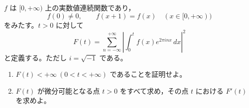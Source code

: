 \newcommand{\C}{\mathbb{C}}
\newcommand{\R}{\mathbb{R}}
\newcommand{\Z}{\mathbb{Z}}
\newcommand{\Tr}{\operatorname{Tr}}
\newcommand{\Impart}{\operatorname{Im}}
\newcommand{\AF}{\operatorname{AF}}
\newcommand{\AX}{\operatorname{AX}}
\newcommand{\GL}{\operatorname{GL}}


\(f\) は \([0,+\infty)\) 上の実数値連続関数であり，
\[
  f(0)\ne0,\qquad f(x+1)=f(x)\quad (x\in[0,+\infty))
\]
をみたす。\(t>0\) に対して
\[
  F(t)=\sum_{n=-\infty}^{+\infty}
  \left|\int_0^t f(x)e^{2\pi i n x}\,dx\right|^2
\]
と定義する。ただし \(i=\sqrt{-1}\) である。

\begin{enumerate}
  \item \(F(t)<+\infty\ (0<t<+\infty)\) であることを証明せよ。
  \item \(F(t)\) が微分可能となる点 \(t>0\) をすべて求め，その点 \(t\) における \(F'(t)\) を求めよ。
\end{enumerate}

%